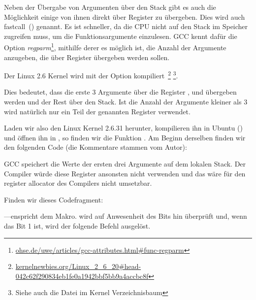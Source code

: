 \newcommand{\URLREGPARM}{\href{http://www.ohse.de/uwe/articles/gcc-attributes.html\#func-regparm}{ohse.de/uwe/articles/gcc-attributes.html\#func-regparm}}

\label{regparm}
Neben der Übergabe von Argumenten über den Stack gibt es auch die Möglichkeit
einige von ihnen direkt über Register zu übergeben. Dies wird auch
fastcall~() genannt. 
Es ist schneller, da die CPU nicht auf den Stack im Speicher zugreifen muss, um
die Funktionsargumente einzulesen.
GCC kennt dafür die Option \emph{regparm}\footnote{\URLREGPARM}, mithilfe derer es
möglich ist, die Anzahl der Argumente anzugeben, die über Register übergeben
werden sollen.

\newcommand{\URLKERNELNEWB}{\href{http://kernelnewbies.org/Linux_2_6_20\#head-042c62f290834eb1fe0a1942bbf5bb9a4accbc8f}{kernelnewbies.org/Linux\_2\_6\_20\#head-042c62f290834eb1fe0a1942bbf5bb9a4accbc8f}}
\newcommand{\CALLINGHFILE}{arch/x86/include/asm/calling.h}

Der Linux 2.6 Kernel wird mit der Option 
kompiliert~\footnote{\URLKERNELNEWB} \footnote{Siehe auch die \TT{\CALLINGHFILE}
Datei im Kernel Verzeichnisbaum}.

Dies bedeutet, dass die erste 3 Argumente über die Register \EAX, \EDX und \ECX
übergeben werden und der Rest über den Stack. Ist die Anzahl der Argumente
kleiner als 3 wird natürlich nur ein Teil der genannten Register verwendet.

Laden wir also den Linux Kernel 2.6.31 herunter, kompilieren ihn in Ubuntu
() und öffnen ihn in \IDA, so finden wir die Funktion
. Am Beginn derselben finden wir den folgenden Code (die
Kommentare stammen vom Autor):


GCC speichert die Werte der ersten drei Argumente auf dem lokalen Stack.
Der Compiler würde diese Register ansonsten nicht verwenden und das wäre für den
\gls{register allocator} des Compilers nicht umsetzbar.

Finden wir dieses Codefragment:



---enspricht dem  Makro.
 wird auf Anwesenheit des  Bits hin überprüft und, wenn
das Bit 1 ist, wird der folgende \JNZ Befehl ausgelöst.
